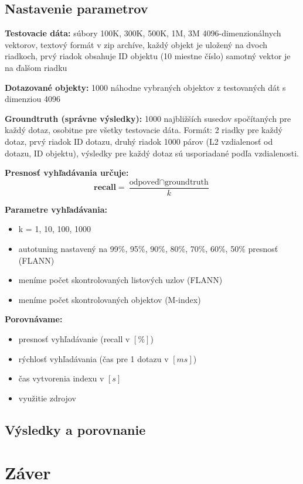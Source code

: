 \documentclass[12pt,a4paper,oneside]{fithesis2}
\begin{document}
\section{Nastavenie parametrov}
\begin{description}

\item \textbf{Testovacie dáta:} súbory 100K, 300K, 500K, 1M, 3M 4096-dimenzionálnych vektorov, textový formát v zip archíve, každý objekt je uložený na dvoch riadkoch, prvý riadok obsahuje ID objektu (10 miestne číslo) samotný vektor je na ďalšom riadku

\item \textbf{Dotazované objekty:} 1000 náhodne vybraných objektov z testovaných dát s dimenziou 4096

\item \textbf{Groundtruth (správne výsledky):} 1000 najbližších susedov spočítaných pre každý dotaz, osobitne pre všetky testovacie dáta. Formát: 2 riadky pre každý dotaz, prvý riadok ID dotazu, druhý riadok 1000 párov (L2 vzdialenosť od dotazu, ID objektu), výsledky pre každý dotaz sú usporiadané podľa vzdialenosti.

\item \textbf{Presnosť vyhľadávania určuje:} 
\begin{equation*}
\textbf{recall} =  \frac{ \textrm{odpoveď} \cap \textrm{groundtruth}}{k}
\end{equation*}

\item \textbf{Parametre vyhľadávania:}
\begin{itemize}
\item k = 1, 10, 100, 1000
\item autotuning nastavený na 99\%, 95\%, 90\%, 80\%, 70\%, 60\%, 50\% presnosť (FLANN)
\item meníme počet skontrolovaných listových uzlov (FLANN)
\item meníme počet skontrolovaných objektov (M-index)
\end{itemize}

\item \textbf{Porovnávame:}
\begin{itemize}
\item presnosť vyhľadávanie (recall v $[\%]$)
\item rýchlosť vyhľadávania (čas pre 1 dotazu v $[ms]$)
\item čas vytvorenia indexu v $[s]$
\item využitie zdrojov
\end{itemize}


\end{description}


\section{Výsledky a porovnanie}
    \chapter{Záver}
    

{}

\end{document}
